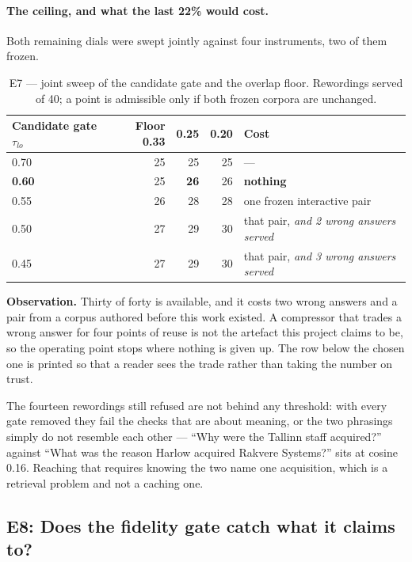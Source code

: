 \documentclass[11pt,a4paper]{article}
\newcommand{\obs}[1]{%
  \par\vspace{2pt}
  \noindent\begin{tcolorbox}[colback=soft,colframe=accent,boxrule=0pt,
    leftrule=2.2pt,arc=0pt,left=7pt,right=5pt,top=4pt,bottom=4pt,breakable]
  \small\textbf{Observation.} #1
  \end{tcolorbox}\par\vspace{2pt}}
\begin{document}
\paragraph{The ceiling, and what the last 22\% would cost.}
Both remaining dials were swept jointly against four instruments, two of them
frozen.

\begin{table}[htbp]
\centering
\caption{E7 --- joint sweep of the candidate gate and the overlap floor.
Rewordings served of 40; a point is admissible only if both frozen corpora are
unchanged.}
\label{tab:reuse-ceiling}
\footnotesize
\begin{tabular}{@{}l r r r l@{}}
\toprule
\textbf{Candidate gate $\tau_{lo}$} & \textbf{Floor 0.33} & \textbf{0.25} &
\textbf{0.20} & \textbf{Cost} \\
\midrule
0.70          & 25 & 25 & 25 & --- \\
\textbf{0.60} & 25 & \textbf{26} & 26 & \textbf{nothing} \\
0.55          & 26 & 28 & 28 & one frozen interactive pair \\
0.50          & 27 & 29 & 30 & that pair, \emph{and 2 wrong answers served} \\
0.45          & 27 & 29 & 30 & that pair, \emph{and 3 wrong answers served} \\
\bottomrule
\end{tabular}
\end{table}

\obs{Thirty of forty is available, and it costs two wrong answers and a pair
from a corpus authored before this work existed. A compressor that trades a
wrong answer for four points of reuse is not the artefact this project claims to
be, so the operating point stops where nothing is given up. The row below the
chosen one is printed so that a reader sees the trade rather than taking the
number on trust.}

The fourteen rewordings still refused are not behind any threshold: with every
gate removed they fail the checks that are about meaning, or the two phrasings
simply do not resemble each other --- ``Why were the Tallinn staff acquired?''
against ``What was the reason Harlow acquired Rakvere Systems?'' sits at cosine
0.16. Reaching that requires knowing the two name one acquisition, which is a
retrieval problem and not a caching one.


\subsection{E8: Does the fidelity gate catch what it claims to?}
\label{sec:e8}
\end{document}
